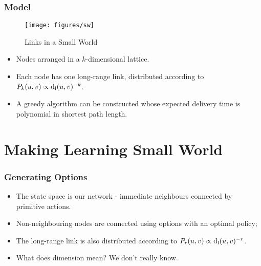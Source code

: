 \documentclass{beamer}
\begin{document}
\begin{frame}
    \frametitle{Model}
    \label{frame:small-worlds-decentralised}
     
    \begin{figure}[h]
        \centering
        \texttt{[image: figures/sw]}
        \label{fig:small-world}
        \caption{Links in a Small World}
    \end{figure}

    \begin{itemize}
            \item Nodes arranged in a $k$-dimensional lattice.
            \item Each node has one long-range link, distributed according to
                $P_{k}( u, v ) \propto \operatorname{d_l}(u,v)^{-k}$.
            \pause 
            \item A greedy algorithm can be constructed whose expected delivery
                time is polynomial in shortest path length.
    \end{itemize}

\end{frame}

\section{Making Learning Small World}
\label{sec:swoptions}

\begin{frame}
    \frametitle{Generating Options}
    \label{frame:swoptions-options}
    \begin{itemize}
            \item The state space is our network - immediate neighbours
                connected by primitive actions.
            \item Non-neighbouring nodes are connected using options with an
                optimal policy; 
            \item The long-range link is also distributed according to
                $P_{r}( u, v ) \propto \operatorname{d_l}(u,v)^{-r}$.
            \pause 
            \item What does dimension mean? We don't really know.
    \end{itemize}
\end{frame}
\end{document}
